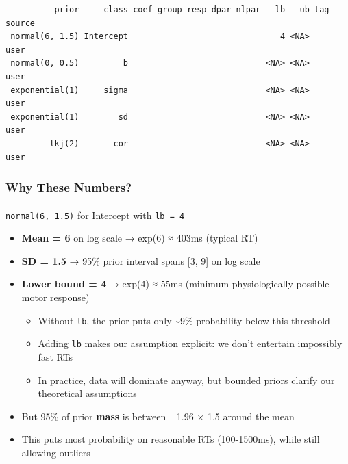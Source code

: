 \documentclass[
  11pt,
]{article}
\makeatletter
\let\oldparagraph\paragraph
\renewcommand{\paragraph}{
    \@ifstar
      \xxxParagraphStar
      \xxxParagraphNoStar
  }
\newcommand{\xxxParagraphStar}[1]{\oldparagraph*{#1}\mbox{}}
\newcommand{\xxxParagraphNoStar}[1]{\oldparagraph{#1}\mbox{}}
\providecommand{\tightlist}{%
  \setlength{\itemsep}{0pt}\setlength{\parskip}{0pt}}
\makeatother
\begin{document}
\begin{verbatim}
          prior     class coef group resp dpar nlpar   lb   ub tag source
 normal(6, 1.5) Intercept                               4 <NA>       user
 normal(0, 0.5)         b                            <NA> <NA>       user
 exponential(1)     sigma                            <NA> <NA>       user
 exponential(1)        sd                            <NA> <NA>       user
         lkj(2)       cor                            <NA> <NA>       user
\end{verbatim}

\subsubsection{Why These Numbers?}\label{why-these-numbers}

\paragraph{\texorpdfstring{\texttt{normal(6,\ 1.5)} for Intercept with
\texttt{lb\ =\ 4}}{normal(6, 1.5) for Intercept with lb = 4}}\label{normal6-1.5-for-intercept-with-lb-4}

\begin{itemize}
\tightlist
\item
  \textbf{Mean = 6} on log scale → exp(6) ≈ 403ms (typical RT)
\item
  \textbf{SD = 1.5} → 95\% prior interval spans {[}3, 9{]} on log scale
\item
  \textbf{Lower bound = 4} → exp(4) ≈ 55ms (minimum physiologically
  possible motor response)

  \begin{itemize}
  \tightlist
  \item
    Without \texttt{lb}, the prior puts only \textasciitilde9\%
    probability below this threshold
  \item
    Adding \texttt{lb} makes our assumption explicit: we don't entertain
    impossibly fast RTs
  \item
    In practice, data will dominate anyway, but bounded priors clarify
    our theoretical assumptions
  \end{itemize}
\item
  But 95\% of prior \textbf{mass} is between ±1.96 × 1.5 around the mean
\item
  This puts most probability on reasonable RTs (100-1500ms), while still
  allowing outliers
\end{itemize}
\end{document}
